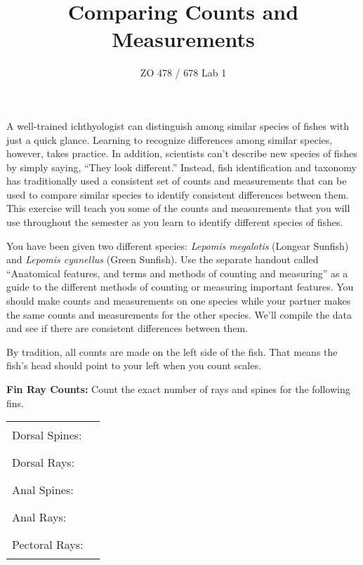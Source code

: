\documentclass[11pt]{article}
\title{Comparing Counts and Measurements}
\author{ZO 478 / 678 Lab 1}
\date{}                                           %
\newcommand{\VSpace}{\vspace{\baselineskip}}
\begin{document}
\maketitle

A well-trained ichthyologist can distinguish among similar species of fishes with just a quick glance.  Learning to recognize differences among similar species, however, takes practice.  In addition, scientists can’t describe new species of fishes by simply saying, “They look different.”  Instead, fish identification and taxonomy has traditionally used a consistent set of counts and measurements that can be used to compare similar species to identify consistent differences between them.   This exercise will teach you some of the counts and measurements that you will use throughout the semester as you learn to identify different species of fishes.

You have been given two different species: \textit{Lepomis megalotis} (Longear Sunfish) and \textit{Lepomis cyanellus} (Green Sunfish).  Use the separate handout called “Anatomical features, and terms and methods of counting and measuring” as a guide to the different methods of counting or measuring important features. You should make counts and measurements on one species while your partner makes the same counts and measurements for the other species.  We’ll compile the data and see if there are consistent differences between them.

By tradition, all counts are made on the left side of the fish.  That means the fish’s head should point to your left when you count scales.

\VSpace

\textbf{Fin Ray Counts:} Count the exact number of rays and spines for the following fins.\VSpace

\begin{tabular}{ll}

Dorsal Spines: & \rule{3cm}{0.4pt} \\[1.5em]

Dorsal Rays: & \rule{3cm}{0.4pt} \\[1.5em]

Anal Spines: & \rule{3cm}{0.4pt} \\[1.5em]

Anal Rays: & \rule{3cm}{0.4pt} \\[1.5em]

Pectoral Rays: & \rule{3cm}{0.4pt} \\

\end{tabular}
\end{document}
